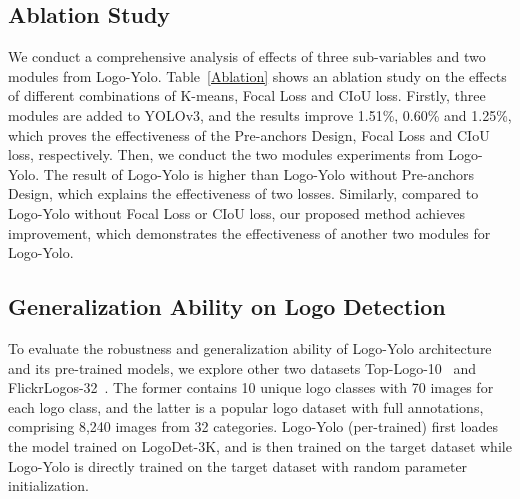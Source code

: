 \documentclass[journal]{IEEEtran}
\begin{document}
\subsection{Ablation Study}
We conduct a comprehensive analysis of effects of three sub-variables and two modules from Logo-Yolo. Table~\ref{Ablation} shows an ablation study on the effects of different combinations of K-means, Focal Loss and CIoU loss. Firstly, three modules are added to YOLOv3, and the results improve 1.51\%, 0.60\% and 1.25\%, which proves the effectiveness of the Pre-anchors Design, Focal Loss and CIoU loss, respectively. Then, we conduct the two modules experiments from Logo-Yolo. The result of Logo-Yolo is higher than Logo-Yolo without Pre-anchors Design, which explains the effectiveness of two losses. Similarly, compared to Logo-Yolo without Focal Loss or CIoU loss, our proposed method achieves improvement, which demonstrates the effectiveness of another two modules for Logo-Yolo.

\subsection{Generalization Ability on Logo Detection}
To evaluate the robustness and generalization ability of Logo-Yolo architecture and its pre-trained models, we explore other two datasets Top-Logo-10~\cite{Su2018Deep} and FlickrLogos-32~\cite{Romberg2011Scalable}. The former contains 10 unique logo classes with 70 images for each logo class, and the latter is a popular logo dataset with full annotations, comprising 8,240 images from 32 categories. Logo-Yolo (per-trained) first loades the model trained on LogoDet-3K, and is then trained on the target dataset while Logo-Yolo is directly trained on the target dataset with random parameter initialization.
\begin{table}[!t]
	\caption{The performance of Logo-Yolo on Top-Logo-10 (\%).}
	\label{10}
	\centering
\end{table}
\end{document}
